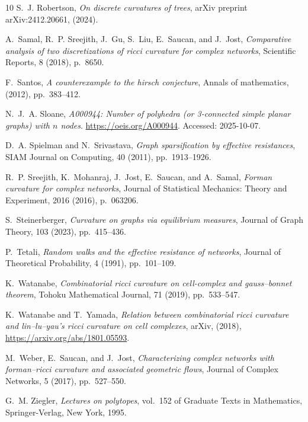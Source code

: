 \documentclass[11pt,a4paper]{amsart}
\begin{document}
\begin{thebibliography}{10}
{\sc S.~J. Robertson}, {\em On discrete curvatures of trees}, arXiv preprint arXiv:2412.20661,  (2024).

{\sc A.~Samal, R.~P. Sreejith, J.~Gu, S.~Liu, E.~Saucan, and J.~Jost}, {\em Comparative analysis of two discretizations of ricci curvature for complex networks}, Scientific Reports, 8 (2018), p.~8650.

{\sc F.~Santos}, {\em A counterexample to the hirsch conjecture}, Annals of mathematics,  (2012), pp.~383--412.

{\sc N.~J.~A. Sloane}, {\em A000944: Number of polyhedra (or 3-connected simple planar graphs) with $n$ nodes}.
\newblock \url{https://oeis.org/A000944}.
\newblock Accessed: 2025-10-07.

{\sc D.~A. Spielman and N.~Srivastava}, {\em Graph sparsification by effective resistances}, SIAM Journal on Computing, 40 (2011), pp.~1913--1926.

{\sc R.~P. Sreejith, K.~Mohanraj, J.~Jost, E.~Saucan, and A.~Samal}, {\em Forman curvature for complex networks}, Journal of Statistical Mechanics: Theory and Experiment, 2016 (2016), p.~063206.

{\sc S.~Steinerberger}, {\em Curvature on graphs via equilibrium measures}, Journal of Graph Theory, 103 (2023), pp.~415--436.

{\sc P.~Tetali}, {\em Random walks and the effective resistance of networks}, Journal of Theoretical Probability, 4 (1991), pp.~101--109.

{\sc K.~Watanabe}, {\em Combinatorial ricci curvature on cell-complex and gauss--bonnet theorem}, Tohoku Mathematical Journal, 71 (2019), pp.~533--547.

{\sc K.~Watanabe and T.~Yamada}, {\em Relation between combinatorial ricci curvature and lin--lu--yau's ricci curvature on cell complexes}, arXiv,  (2018), \url{https://arxiv.org/abs/1801.05593}.

{\sc M.~Weber, E.~Saucan, and J.~Jost}, {\em Characterizing complex networks with forman--ricci curvature and associated geometric flows}, Journal of Complex Networks, 5 (2017), pp.~527--550.

{\sc G.~M. Ziegler}, {\em Lectures on polytopes}, vol.~152 of Graduate Texts in Mathematics, Springer-Verlag, New York, 1995.

\end{thebibliography}
\end{document}
